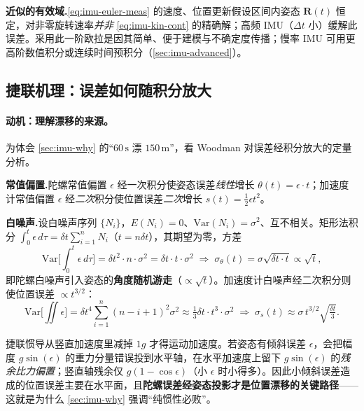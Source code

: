 \begin{note}
\textbf{近似的有效域.}\;\cref{eq:imu-euler-meas} 的速度、位置更新假设区间内姿态 $\mathbf R(t)$ 恒定，对非零旋转速率\emph{并非} \cref{eq:imu-kin-cont} 的精确解；高频 IMU（$\Delta t$ 小）缓解此误差\cite{forster2017preintegration}。采用此一阶欧拉是因其简单、便于建模与不确定度传播；慢率 IMU 可用更高阶数值积分或连续时间预积分（\cref{sec:imu-advanced}）。
\end{note}

\subsection{捷联机理：误差如何随积分放大}
\label{subsec:strapdown-error}

\paragraph{动机：理解漂移的来源。}
为体会 \cref{sec:imu-why} 的“$60\,\mathrm s$ 漂 $150\,\mathrm m$”，看 Woodman 对误差经积分放大的定量分析\cite{woodman2007inertial}。

\textbf{常值偏置.}\;陀螺常值偏置 $\epsilon$ 经一次积分使姿态误差\emph{线性}增长 $\theta(t)=\epsilon\cdot t$；加速度计常值偏置 $\epsilon$ 经\emph{二次}积分使位置误差\emph{二次}增长 $s(t)=\tfrac12\epsilon t^2$。

\textbf{白噪声.}\;设白噪声序列 $\{N_i\}$，$E(N_i)=0$、$\mathrm{Var}(N_i)=\sigma^2$、互不相关。矩形法积分 $\int_0^t\epsilon\,d\tau=\delta t\sum_{i=1}^nN_i$（$t=n\delta t$），其期望为零，方差
\[
  \mathrm{Var}\Big[\int_0^t\epsilon\,d\tau\Big]=\delta t^2\cdot n\cdot\sigma^2=\delta t\cdot t\cdot\sigma^2
  \;\Rightarrow\; \sigma_\theta(t)=\sigma\sqrt{\delta t\cdot t}\propto\sqrt t,
\]
即陀螺白噪声引入姿态的\textbf{角度随机游走}（$\propto\sqrt t$）。加速度计白噪声经二次积分则使位置误差 $\propto t^{3/2}$：
\[
  \mathrm{Var}\Big[\iint\epsilon\Big]=\delta t^4\sum_{i=1}^n(n-i+1)^2\sigma^2\approx\tfrac13\delta t\cdot t^3\cdot\sigma^2
  \;\Rightarrow\;\sigma_s(t)\approx\sigma\,t^{3/2}\sqrt{\tfrac{\delta t}{3}}.
\]

\begin{insight}\label{ins:gravity-tilt}
捷联惯导从竖直加速度里减掉 $1g$ 才得运动加速度。若姿态有倾斜误差 $\epsilon$，会把幅度 $g\sin(\epsilon)$ 的重力分量错误投到水平轴，在水平加速度上留下 $g\sin(\epsilon)$ 的\emph{残余比力偏置}；竖直轴残余仅 $g(1-\cos\epsilon)$（小 $\epsilon$ 时小得多）。因此小倾斜误差造成的位置误差主要在水平面，且\textbf{陀螺误差经姿态投影才是位置漂移的关键路径}——这就是为什么 \cref{sec:imu-why} 强调“纯惯性必败”。\cite{woodman2007inertial}
\end{insight}

